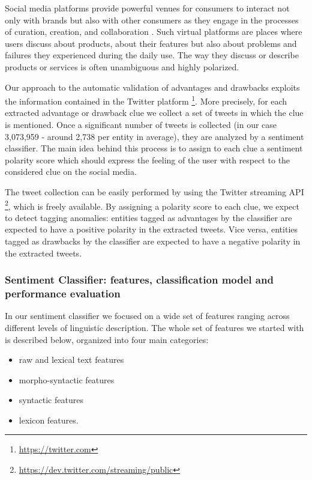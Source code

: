 \documentclass[]{book}
\providecommand{\tightlist}{%
  \setlength{\itemsep}{0pt}\setlength{\parskip}{0pt}}
\let\rmarkdownfootnote\footnote%
\def\footnote{\protect\rmarkdownfootnote}
\theoremstyle{definition}
\theoremstyle{definition}
\theoremstyle{definition}
\theoremstyle{remark}
\begin{document}
Social media platforms provide powerful venues for consumers to interact
not only with brands but also with other consumers as they engage in the
processes of curation, creation, and collaboration
\citep{evans2010social}. Such virtual platforms are places where users
discuss about products, about their features but also about problems and
failures they experienced during the daily use. The way they discuss or
describe products or services is often unambiguous and highly polarized.

Our approach to the automatic validation of advantages and drawbacks
exploits the information contained in the Twitter platform \footnote{\url{https://twitter.com}}.
More precisely, for each extracted advantage or drawback clue we collect
a set of tweets in which the clue is mentioned. Once a significant
number of tweets is collected (in our case 3,073,959 - around 2,738 per
entity in average), they are analyzed by a sentiment classifier. The
main idea behind this process is to assign to each clue a sentiment
polarity score which should express the feeling of the user with respect
to the considered clue on the social media.

The tweet collection can be easily performed by using the Twitter
streaming API \footnote{\url{https://dev.twitter.com/streaming/public}},
which is freely available. By assigning a polarity score to each clue,
we expect to detect tagging anomalies: entities tagged as advantages by
the classifier are expected to have a positive polarity in the extracted
tweets. Vice versa, entities tagged as drawbacks by the classifier are
expected to have a negative polarity in the extracted tweets.

\subsubsection*{Sentiment Classifier: features, classification model and
performance
evaluation}\label{sentiment-classifier-features-classification-model-and-performance-evaluation}

In our sentiment classifier we focused on a wide set of features ranging
across different levels of linguistic description. The whole set of
features we started with is described below, organized into four main
categories:

\begin{itemize}
\tightlist
\item
  raw and lexical text features
\item
  morpho-syntactic features
\item
  syntactic features
\item
  lexicon features.
\end{itemize}
\end{document}
